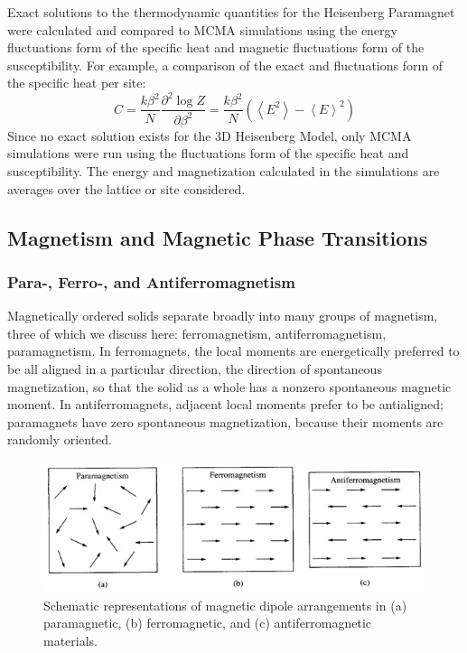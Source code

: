 \documentclass[a4paper,12pt]{article}
\begin{document}
Exact solutions to the thermodynamic quantities for the Heisenberg Paramagnet were calculated and compared to MCMA simulations using the energy fluctuations form of the specific heat and magnetic fluctuations form of the susceptibility. For example, a comparison of the exact and fluctuations form of the specific heat per site:
	\begin{equation}\label{specific_heat_example}
		C =\frac{k\beta^2}{N}\frac{\partial^2\log{Z}}{\partial\beta^2} = \frac{k\beta^2}{N}(\left< E^2 \right> - \left< E \right>^2)
	\end{equation}
Since no exact solution exists for the 3D Heisenberg Model, only MCMA simulations were run using the fluctuations form of the specific heat and susceptibility. The energy and magnetization calculated in the simulations are averages over the lattice or site considered. \cite{gould}
\subsection{Magnetism and Magnetic Phase Transitions}
	\subsubsection{Para-, Ferro-, and Antiferromagnetism}
	Magnetically ordered solids separate broadly into many groups of magnetism, three of which we discuss here: ferromagnetism, antiferromagnetism, paramagnetism. In ferromagnets, the local moments are energetically preferred to be all aligned in a particular direction, the direction of spontaneous magnetization, so that the solid as a whole has a nonzero spontaneous magnetic moment. In antiferromagnets, adjacent local
moments prefer to be antialigned; paramagnets have zero spontaneous magnetization, because their moments are randomly oriented. 
	\begin{figure}[H]
		\centering
		\includegraphics[scale=0.5]{ferro_para_anti}
		\caption{Schematic representations of magnetic dipole arrangements in (a) paramagnetic, (b) ferromagnetic, and (c) antiferromagnetic materials.}
		\label{fig:Types_of_Magnetism}
	\end{figure}
\end{document}
